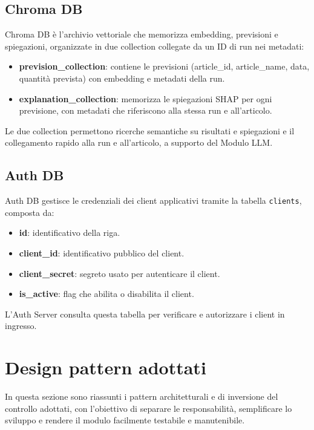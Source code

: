 \subsection{Chroma DB}
Chroma DB è l’archivio vettoriale che memorizza embedding, previsioni e spiegazioni, organizzate in due collection collegate da un ID di run nei metadati:
\begin{itemize}
    \item \textbf{prevision\_collection}: contiene le previsioni (article\_id, article\_name, data, quantità prevista) con embedding e metadati della run.
    \item \textbf{explanation\_collection}: memorizza le spiegazioni SHAP per ogni previsione, con metadati che riferiscono alla stessa run e all’articolo.
\end{itemize}
Le due collection permettono ricerche semantiche su risultati e spiegazioni e il collegamento rapido alla run e all’articolo, a supporto del Modulo LLM.

\subsection{Auth DB}
Auth DB gestisce le credenziali dei client applicativi tramite la tabella \texttt{clients}, composta da:
\begin{itemize}
    \item \textbf{id}: identificativo della riga.
    \item \textbf{client\_id}: identificativo pubblico del client.
    \item \textbf{client\_secret}: segreto usato per autenticare il client.
    \item \textbf{is\_active}: flag che abilita o disabilita il client.
\end{itemize}
L’Auth Server consulta questa tabella per verificare e autorizzare i client in ingresso.

\section{Design pattern adottati}
\label{sec:design-pattern}
In questa sezione sono riassunti i pattern architetturali e di inversione del controllo adottati, con l’obiettivo di separare le responsabilità, semplificare lo sviluppo e rendere il modulo facilmente testabile e manutenibile.

